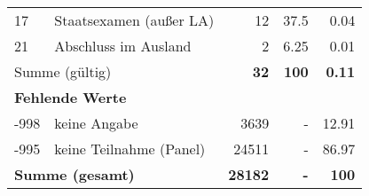 \begin{longtable}{lXrrr}
     17 &
     \multicolumn{1}{X}{ Staatsexamen (außer LA)   } &


       \num{12} &
       \num[round-mode=places,round-precision=2]{37.5} &
         \num[round-mode=places,round-precision=2]{0.04} \\

     21 &
     \multicolumn{1}{X}{ Abschluss im Ausland   } &


       \num{2} &
       \num[round-mode=places,round-precision=2]{6.25} &
         \num[round-mode=places,round-precision=2]{0.01} \\
     \midrule
     \multicolumn{2}{l}{Summe (gültig)} &
       \textbf{\num{32}} &
     \textbf{\num{100}} &
       \textbf{\num[round-mode=places,round-precision=2]{0.11}} \\
     \multicolumn{5}{l}{\textbf{Fehlende Werte}}\\
       -998 &
       keine Angabe &
         \num{3639} &
        - &
         \num[round-mode=places,round-precision=2]{12.91} \\
       -995 &
       keine Teilnahme (Panel) &
         \num{24511} &
        - &
         \num[round-mode=places,round-precision=2]{86.97} \\
     \midrule
     \multicolumn{2}{l}{\textbf{Summe (gesamt)}} &
          \textbf{\num{28182}} &
        \textbf{-} &
        \textbf{\num{100}} \\
     \bottomrule
     \end{longtable}
     
